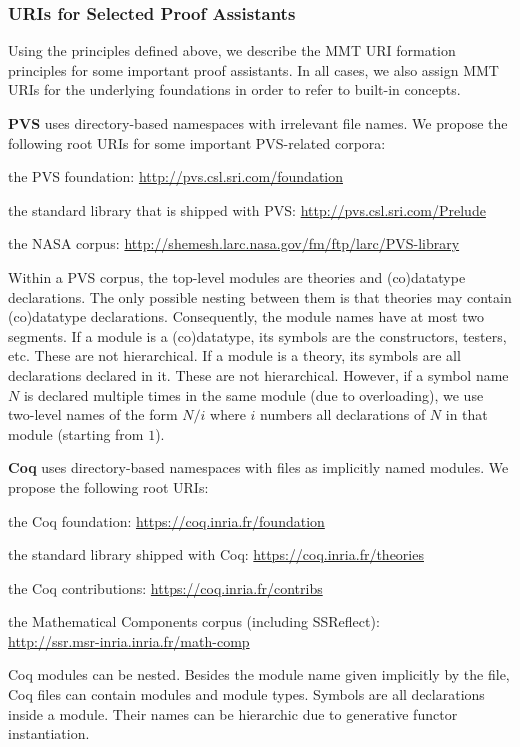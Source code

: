 \subsubsection{URIs for Selected Proof Assistants}

Using the principles defined above, we describe the MMT URI formation principles for some important proof assistants.
In all cases, we also assign MMT URIs for the underlying foundations in order to refer to built-in concepts.
\medskip

\textbf{PVS} \cite{pvs} uses directory-based namespaces with irrelevant file names.
We propose the following root URIs for some important PVS-related corpora:
\begin{compactitem}\small
 \item the PVS foundation: \url{http://pvs.csl.sri.com/foundation}
 \item the standard library that is shipped with PVS: \url{http://pvs.csl.sri.com/Prelude}
 \item the NASA corpus: \url{http://shemesh.larc.nasa.gov/fm/ftp/larc/PVS-library}
\end{compactitem}
Within a PVS corpus, the top-level modules are theories and (co)datatype declarations.
The only possible nesting between them is that theories may contain (co)datatype
declarations.  Consequently, the module names have at most two segments.  If a module is a
(co)datatype, its symbols are the constructors, testers, etc.  These are not hierarchical.
If a module is a theory, its symbols are all declarations declared in it.  These are not
hierarchical.  However, if a symbol name $N$ is declared multiple times in the same module
(due to overloading), we use two-level names of the form $N/i$ where $i$ numbers all
declarations of $N$ in that module (starting from $1$).  \medskip

\textbf{Coq} \cite{coq} uses directory-based namespaces with files as implicitly named modules.
We propose the following root URIs:
\begin{compactitem}
 \item the Coq foundation: \url{https://coq.inria.fr/foundation}
 \item the standard library shipped with Coq: \url{https://coq.inria.fr/theories}
 \item the Coq contributions: \url{https://coq.inria.fr/contribs}
 \item the Mathematical Components corpus (including SSReflect):\\ \url{http://ssr.msr-inria.inria.fr/math-comp}
\end{compactitem}
Coq modules can be nested.
Besides the module name given implicitly by the file, Coq files can contain modules and module types.
Symbols are all declarations inside a module.
Their names can be hierarchic due to generative functor instantiation.
\medskip

